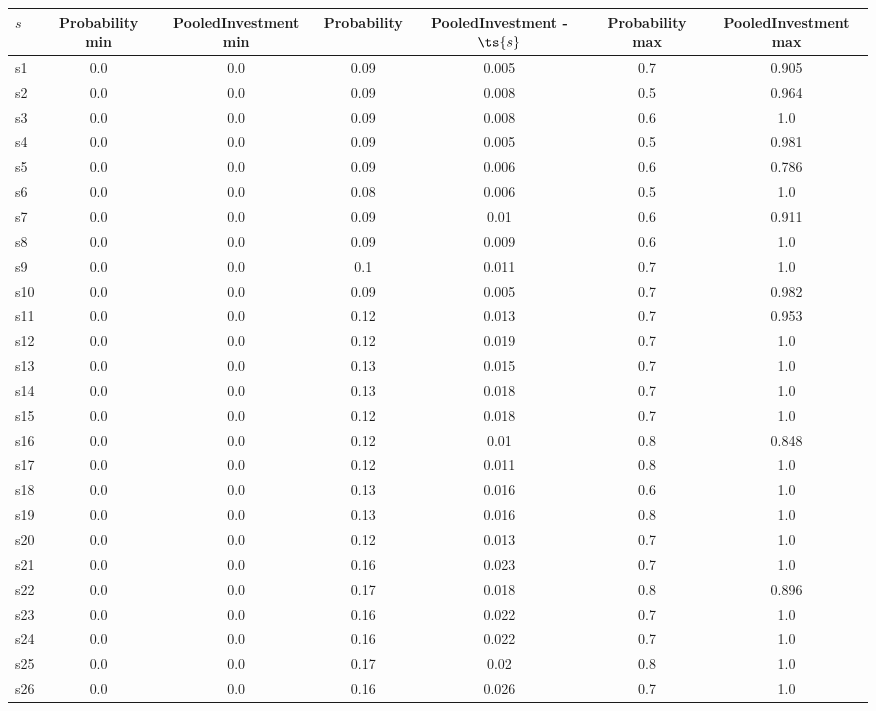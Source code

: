 \documentclass{article}
\begin{document}
\noindent\begin{tabular}{|l|c|c|c|c|c|c|}
\hline
$s$& Probability min & PooledInvestment min & Probability & PooledInvestment - $\ts{s}$ & Probability max & PooledInvestment max\\
\hline
s1 &0.0 & 0.0 & 0.09 & 0.005 & 0.7 & 0.905\\
\hline
s2 &0.0 & 0.0 & 0.09 & 0.008 & 0.5 & 0.964\\
\hline
s3 &0.0 & 0.0 & 0.09 & 0.008 & 0.6 & 1.0\\
\hline
s4 &0.0 & 0.0 & 0.09 & 0.005 & 0.5 & 0.981\\
\hline
s5 &0.0 & 0.0 & 0.09 & 0.006 & 0.6 & 0.786\\
\hline
s6 &0.0 & 0.0 & 0.08 & 0.006 & 0.5 & 1.0\\
\hline
s7 &0.0 & 0.0 & 0.09 & 0.01 & 0.6 & 0.911\\
\hline
s8 &0.0 & 0.0 & 0.09 & 0.009 & 0.6 & 1.0\\
\hline
s9 &0.0 & 0.0 & 0.1 & 0.011 & 0.7 & 1.0\\
\hline
s10 &0.0 & 0.0 & 0.09 & 0.005 & 0.7 & 0.982\\
\hline
s11 &0.0 & 0.0 & 0.12 & 0.013 & 0.7 & 0.953\\
\hline
s12 &0.0 & 0.0 & 0.12 & 0.019 & 0.7 & 1.0\\
\hline
s13 &0.0 & 0.0 & 0.13 & 0.015 & 0.7 & 1.0\\
\hline
s14 &0.0 & 0.0 & 0.13 & 0.018 & 0.7 & 1.0\\
\hline
s15 &0.0 & 0.0 & 0.12 & 0.018 & 0.7 & 1.0\\
\hline
s16 &0.0 & 0.0 & 0.12 & 0.01 & 0.8 & 0.848\\
\hline
s17 &0.0 & 0.0 & 0.12 & 0.011 & 0.8 & 1.0\\
\hline
s18 &0.0 & 0.0 & 0.13 & 0.016 & 0.6 & 1.0\\
\hline
s19 &0.0 & 0.0 & 0.13 & 0.016 & 0.8 & 1.0\\
\hline
s20 &0.0 & 0.0 & 0.12 & 0.013 & 0.7 & 1.0\\
\hline
s21 &0.0 & 0.0 & 0.16 & 0.023 & 0.7 & 1.0\\
\hline
s22 &0.0 & 0.0 & 0.17 & 0.018 & 0.8 & 0.896\\
\hline
s23 &0.0 & 0.0 & 0.16 & 0.022 & 0.7 & 1.0\\
\hline
s24 &0.0 & 0.0 & 0.16 & 0.022 & 0.7 & 1.0\\
\hline
s25 &0.0 & 0.0 & 0.17 & 0.02 & 0.8 & 1.0\\
\hline
s26 &0.0 & 0.0 & 0.16 & 0.026 & 0.7 & 1.0\\

\end{tabular}
\end{document}
